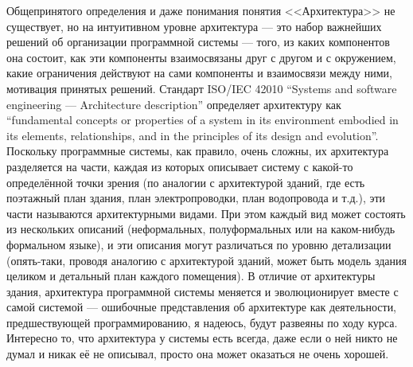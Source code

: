 \documentclass{../../text-style}
\begin{document}
Общепринятого определения и даже понимания понятия <<Архитектура>> не существует, но на интуитивном уровне архитектура --- это набор важнейших решений об организации программной системы --- того, из каких компонентов она состоит, как эти компоненты взаимосвязаны друг с другом и с окружением, какие ограничения действуют на сами компоненты и взаимосвязи между ними, мотивация принятых решений. Стандарт ISO/IEC 42010 ``Systems and software engineering --- Architecture description'' определяет архитектуру как ``fundamental concepts or properties of a system in its environment embodied in its elements, relationships, and in the principles of its design and evolution''. Поскольку программные системы, как правило, очень сложны, их архитектура разделяется на части, каждая из которых описывает систему с какой-то определённой точки зрения (по аналогии с архитектурой зданий, где есть поэтажный план здания, план электропроводки, план водопровода и т.д.), эти части называются архитектурными видами. При этом каждый вид может состоять из нескольких описаний (неформальных, полуформальных или на каком-нибудь формальном языке), и эти описания могут различаться по уровню детализации (опять-таки, проводя аналогию с архитектурой зданий, может быть модель здания целиком и детальный план каждого помещения). В отличие от архитектуры здания, архитектура программной системы меняется и эволюционирует вместе с самой системой --- ошибочные представления об архитектуре как деятельности, предшествующей программированию, я надеюсь, будут развеяны по ходу курса. Интересно то, что архитектура у системы есть всегда, даже если о ней никто не думал и никак её не описывал, просто она может оказаться не очень хорошей.
\end{document}
